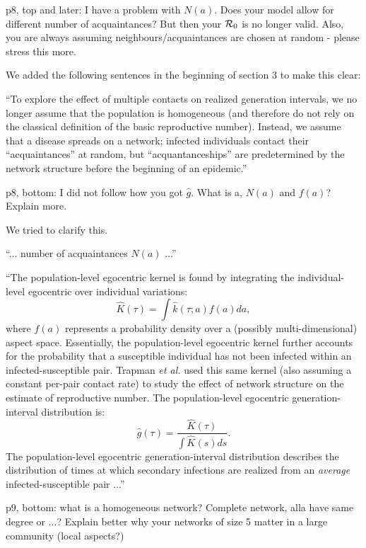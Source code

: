 \documentclass[12pt]{article}
\newcommand{\RR}{\ensuremath{{\cal R}}}
\newcommand{\revtext}{\textsf}
\begin{document}
\revtext{p8, top and later: I have a problem with $N(a)$. Does your model allow for different number of acquaintances? But then your $\RR_0$ is no longer valid. Also, you are always assuming neighbours/acquaintances are chosen at random - please stress this more.}

We added the following sentences in the beginning of section 3 to make this clear:

``To explore the effect of multiple contacts on realized generation intervals, we no longer assume that the population is homogeneous (and therefore do not rely on the classical definition of the basic reproductive number).
Instead, we assume that a disease spreads on a network;
infected individuals contact their ``acquaintances'' at random, but ``acquantanceships'' are predetermined by the network structure before the beginning of an epidemic.''

\revtext{p8, bottom: I did not follow how you got $\hat g$. What is a, $N(a)$ and $f(a)$? Explain more.}

We tried to clarify this.

``... number of acquaintances $N(a)$ ...''

``The population-level egocentric kernel is found by integrating the individual-level egocentric over individual variations:
\begin{equation}\label{eq:ego}
\hat{K}(\tau) = \int \hat{k}(\tau; a) f(a) da,
\end{equation}
where $f(a)$ represents a probability density over a (possibly multi-dimensional) aspect space.
Essentially, the population-level egocentric kernel further accounts for the probability that a susceptible individual has not been infected within an infected-susceptible pair.
Trapman \textit{et al.} used this same kernel (also assuming a constant per-pair contact rate) to study the effect of network structure on the estimate of reproductive number.
The population-level egocentric generation-interval distribution is:
\begin{equation}
\hat{g}(\tau) = \frac{\hat{K}(\tau)}{\int \hat{K}(s) ds}.
\label{eq:conditional}
\end{equation}
The population-level egocentric generation-interval distribution describes the distribution of times at which secondary infections are realized from an \emph{average} infected-susceptible pair ...''

\revtext{p9, bottom: what is a homogeneous network? Complete network, alla have same degree or ...? Explain better why your networks of size 5 matter in a large community (local aspects?)}
\end{document}
